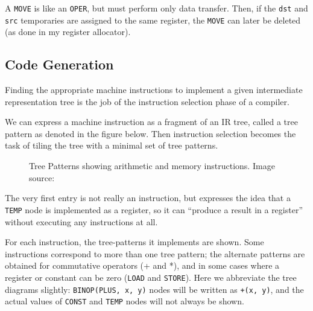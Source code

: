 A \texttt{MOVE}
is like an
\texttt{OPER},
but must perform only data transfer. Then, if the
\texttt{dst} and
\texttt{src}
temporaries are assigned to the same register, the
\texttt{MOVE}
can later be deleted (as done in my register allocator).

\hypertarget{code-generation}{%
	\subsection{Code Generation}\label{code-generation}}

Finding the appropriate machine instructions to implement a given
intermediate representation tree is the job of the instruction selection
phase of a compiler.

We can express a machine instruction as a fragment of an IR tree, called
a tree pattern as denoted in the figure below. Then instruction
selection becomes the task of tiling the tree with a minimal set of tree
patterns.

\begin{figure}
	\centering
	\caption{Tree Patterns showing arithmetic and memory instructions. Image source: \cite{tigerbook}}
\end{figure}

The very first entry is not really an instruction, but expresses the
idea that a
\texttt{TEMP}
node is implemented as a register, so it can ``produce a result in a
register'' without executing any instructions at all.

For each instruction, the tree-patterns it implements are shown. Some
instructions correspond to more than one tree pattern; the alternate
patterns are obtained for commutative operators (+ and *), and in some
cases where a register or constant can be zero
(\texttt{LOAD}
and
\texttt{STORE}).
Here we abbreviate the tree diagrams slightly:
\texttt{BINOP(PLUS, x, y)}
nodes will be written as
\texttt{+(x, y)},
and the actual values of
\texttt{CONST}
and
\texttt{TEMP}
nodes will not always be shown.

